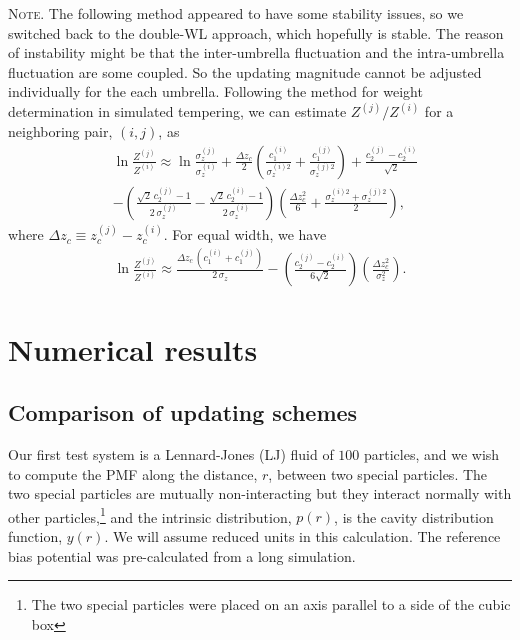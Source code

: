 \documentclass[preprint, superscriptaddress, floatfix]{revtex4-1}
\newcommand{\note}[1]{{\color{DarkGreen}\footnotesize \textsc{Note.} #1}}
\begin{document}
\note{The
  following method appeared to have some stability issues,
  so we switched back to the double-WL approach,
  which hopefully is stable.
  The reason of instability might be
  that the inter-umbrella fluctuation
  and the intra-umbrella fluctuation are some coupled.
  So the updating magnitude cannot be adjusted individually
  for the each umbrella.
  Following the method for weight determination
  in simulated tempering\cite{park2007,
  *nguyen2013, *zhang2015st},
  we can estimate $Z^{(j)}/Z^{(i)}$
  for a neighboring pair, $(i, j)$, as
  \begin{align*}
    &\ln\frac{ Z^{(j)} }{ Z^{(i)} }
    \approx
    \ln\frac{ \sigma_z^{(j)} }{ \sigma_z^{(i)} }
    +
    \frac{ \Delta z_c } { 2 }
    \left(
      \frac{ c_1^{(i)} } { \sigma_z^{(i) 2} }
      +
      \frac{ c_1^{(j)} } { \sigma_z^{(j) 2} }
    \right)
    +
    \frac{ c_2^{(j)} - c_2^{(i)} } { \sqrt 2 }
    \\
    &-
    \left(
      \frac{ \sqrt 2 \, c_2^{(j)} - 1 }
           { 2 \, \sigma_z^{(j)} }
      -
      \frac{ \sqrt 2 \, c_2^{(i)} - 1 }
           { 2 \, \sigma_z^{(i)} }
    \right)
    \left(
      \frac{ \Delta z_c^{2} } { 6 }
      +
      \frac{ \sigma_z^{(i) 2} + \sigma_z^{(j) 2} } { 2 }
    \right)
    ,
  \end{align*}
  where
  $\Delta z_c \equiv z_c^{(j)} - z_c^{(i)}$.
  For equal width, we have
  \begin{align*}
    \ln\frac{ Z^{(j)} }{ Z^{(i)} }
    \approx
    \frac{ \Delta z_c \, ( c_1^{(i)} + c_1^{(j)} ) } { 2 \, \sigma_z }
    -
    \left(
      \frac{ c_2^{(j)} - c_2^{(i)} }
           { 6 \sqrt 2 }
    \right)
    \left(
      \frac{ \Delta z_c^{2} } { \sigma_z^2 }
    \right)
    .
  \end{align*}
}



\section{\label{sec:results}
Numerical results}



\subsection{\label{sec:lj}
Comparison of updating schemes}


Our first test system is
a Lennard-Jones (LJ) fluid of $100$ particles,
and we wish to compute the PMF along
the distance, $r$, between two special particles.
%
The two special particles are mutually non-interacting
but they interact normally with other particles,\footnote{The
two special particles were placed on an axis parallel to a side of the cubic box}
and the intrinsic distribution, $p(r)$, is
the cavity distribution function, $y(r)$\cite{hansen}.
%
We will assume reduced units in this calculation.
%
The reference bias potential was pre-calculated from a long simulation.
\end{document}
